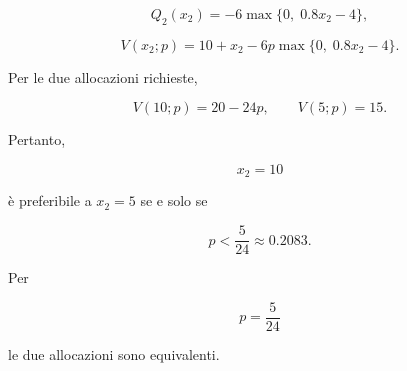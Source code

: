 \begin{exercise}
\[
Q_2(x_2)
=
-6\max\{0,\;0.8x_2-4\},
\]

\[
V(x_2;p)
=
10+x_2
-
6p\max\{0,\;0.8x_2-4\}.
\]

Per le due allocazioni richieste,

\[
V(10;p)=20-24p,
\qquad
V(5;p)=15.
\]

Pertanto,

\[
x_2=10
\]

\noindent \`e preferibile a $x_2=5$ se e solo se

\[
p<\frac{5}{24}
\approx
0.2083.
\]

Per

\[
p=\frac{5}{24}
\]

\noindent le due allocazioni sono equivalenti.

\end{exercise}


